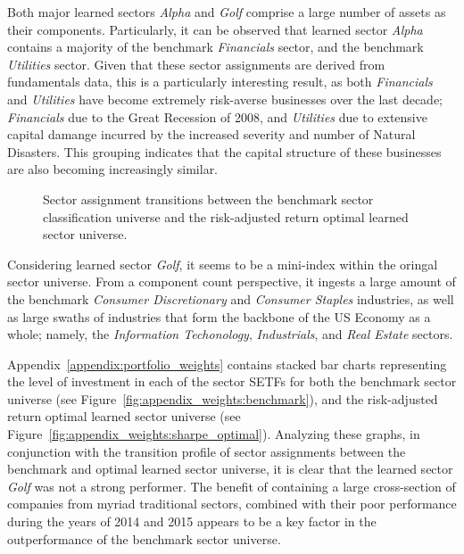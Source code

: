 \documentclass[../main.tex]{subfiles}
\begin{document}
Both major learned sectors \textit{Alpha} and \textit{Golf} comprise a large number of assets as their components. Particularly, it can be observed that learned sector \textit{Alpha} contains a majority of the benchmark \textit{Financials} sector, and the benchmark \textit{Utilities} sector. Given that these sector assignments are derived from fundamentals data, this is a particularly interesting result, as both \textit{Financials} and \textit{Utilities} have become extremely risk-averse businesses over the last decade; \textit{Financials} due to the Great Recession of 2008, and \textit{Utilities} due to extensive capital damange incurred by the increased severity and number of Natural Disasters. This grouping indicates that the capital structure of these businesses are also becoming increasingly similar.

\begin{figure}[!h]
    \centering
    \caption{Sector assignment transitions between the benchmark sector classification universe and the risk-adjusted return optimal learned sector universe.}
    \label{fig:benchmark_comparison:ls_optimal_assets}
\end{figure}

Considering learned sector \textit{Golf}, it seems to be a mini-index within the oringal sector universe. From a component count perspective, it ingests a large amount of the benchmark \textit{Consumer Discretionary} and \textit{Consumer Staples} industries, as well as large swaths of industries that form the backbone of the US Economy as a whole; namely, the \textit{Information Techonology}, \textit{Industrials}, and \textit{Real Estate} sectors.

Appendix~\ref{appendix:portfolio_weights} contains stacked bar charts representing the level of investment in each of the sector SETFs for both the benchmark sector universe (see Figure~\ref{fig:appendix_weights:benchmark}), and the risk-adjusted return optimal learned sector universe (see Figure~\ref{fig:appendix_weights:sharpe_optimal}). Analyzing these graphs, in conjunction with the transition profile of sector assignments between the benchmark and optimal learned sector universe, it is clear that the learned sector \textit{Golf} was not a strong performer. The benefit of containing a large cross-section of companies from myriad traditional sectors, combined with their poor performance during the years of 2014 and 2015 appears to be a key factor in the outperformance of the benchmark sector universe.
\end{document}
